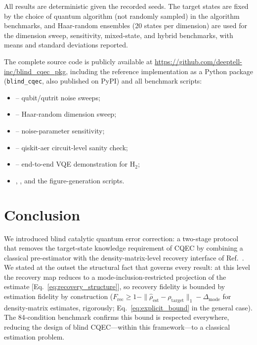 \documentclass[a4paper,onecolumn]{quantumarticle}
\newcommand{\Frec}{F_\mathrm{rec}}
\newcommand{\rhot}{\rho_\mathrm{target}}
\newcommand{\rhoe}{\hat{\rho}_\mathrm{est}}
\begin{document}
All results are deterministic given the recorded seeds.
The target states are fixed by the choice of quantum algorithm (not randomly sampled) in the algorithm benchmarks, and Haar-random ensembles (20 states per dimension) are used for the dimension sweep, sensitivity, mixed-state, and hybrid benchmarks, with means and standard deviations reported.

The complete source code is publicly available at \url{https://github.com/deeptell-inc/blind_cqec_pkg}, including the reference implementation as a Python package (\texttt{blind\_cqec}, also published on PyPI) and all benchmark scripts:
\begin{itemize}\setlength{\itemsep}{0pt}\setlength{\parsep}{0pt}
  \item {} -- qubit/qutrit noise sweeps;
  \item {} -- Haar-random dimension sweep;
  \item {} -- noise-parameter sensitivity;
  \item {} -- qiskit-aer circuit-level sanity check;
  \item {} -- end-to-end VQE demonstration for H$_2$;
  \item {}, , and the figure-generation scripts.
\end{itemize} 

      
\section{Conclusion}
\label{sec:conclusion}

We introduced blind catalytic quantum error correction: a two-stage protocol that removes the target-state knowledge requirement of CQEC by combining a classical pre-estimator with the density-matrix-level recovery interface of Ref.~\cite{Wakaura2026unified}.
We stated at the outset the structural fact that governs every result: at this level the recovery map reduces to a mode-inclusion-restricted projection of the estimate [Eq.~\eqref{eq:recovery_structure}], so recovery fidelity is bounded by estimation fidelity by construction ($\Frec \geq 1 - \|\rhoe - \rhot\|_1 - \Delta_\mathrm{mode}$ for density-matrix estimates, rigorously; Eq.~\eqref{eq:explicit_bound} in the general case).
The 84-condition benchmark confirms this bound is respected everywhere, reducing the design of blind CQEC---within this framework---to a classical estimation problem.
\end{document}

